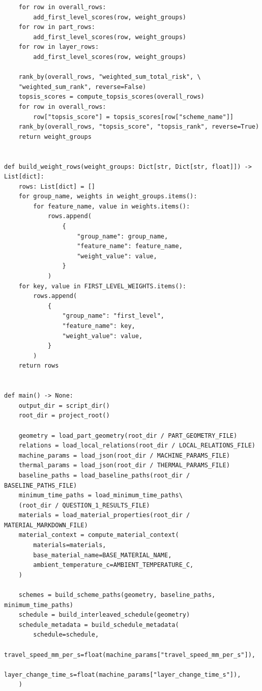 \documentclass[a4paper, 12pt]{ctexart}
\begin{document}
\begin{verbatim}
    for row in overall_rows:
        add_first_level_scores(row, weight_groups)
    for row in part_rows:
        add_first_level_scores(row, weight_groups)
    for row in layer_rows:
        add_first_level_scores(row, weight_groups)

    rank_by(overall_rows, "weighted_sum_total_risk", \
    "weighted_sum_rank", reverse=False)
    topsis_scores = compute_topsis_scores(overall_rows)
    for row in overall_rows:
        row["topsis_score"] = topsis_scores[row["scheme_name"]]
    rank_by(overall_rows, "topsis_score", "topsis_rank", reverse=True)
    return weight_groups


def build_weight_rows(weight_groups: Dict[str, Dict[str, float]]) -> List[dict]:
    rows: List[dict] = []
    for group_name, weights in weight_groups.items():
        for feature_name, value in weights.items():
            rows.append(
                {
                    "group_name": group_name,
                    "feature_name": feature_name,
                    "weight_value": value,
                }
            )
    for key, value in FIRST_LEVEL_WEIGHTS.items():
        rows.append(
            {
                "group_name": "first_level",
                "feature_name": key,
                "weight_value": value,
            }
        )
    return rows


def main() -> None:
    output_dir = script_dir()
    root_dir = project_root()

    geometry = load_part_geometry(root_dir / PART_GEOMETRY_FILE)
    relations = load_local_relations(root_dir / LOCAL_RELATIONS_FILE)
    machine_params = load_json(root_dir / MACHINE_PARAMS_FILE)
    thermal_params = load_json(root_dir / THERMAL_PARAMS_FILE)
    baseline_paths = load_baseline_paths(root_dir / BASELINE_PATHS_FILE)
    minimum_time_paths = load_minimum_time_paths\
    (root_dir / QUESTION_1_RESULTS_FILE)
    materials = load_material_properties(root_dir / MATERIAL_MARKDOWN_FILE)
    material_context = compute_material_context(
        materials=materials,
        base_material_name=BASE_MATERIAL_NAME,
        ambient_temperature_c=AMBIENT_TEMPERATURE_C,
    )

    schemes = build_scheme_paths(geometry, baseline_paths, minimum_time_paths)
    schedule = build_interleaved_schedule(geometry)
    schedule_metadata = build_schedule_metadata(
        schedule=schedule,
        travel_speed_mm_per_s=float(machine_params["travel_speed_mm_per_s"]),
        layer_change_time_s=float(machine_params["layer_change_time_s"]),
    )


\end{verbatim}
\end{document}
